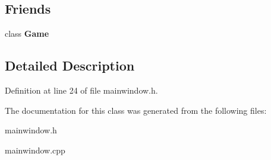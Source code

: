 \subsection*{Friends}
\begin{DoxyCompactItemize}
\item 
\hypertarget{class_main_window_aa2fab026580d6f14280c2ffb8063a314}{}class {\bfseries Game}\label{class_main_window_aa2fab026580d6f14280c2ffb8063a314}

\end{DoxyCompactItemize}


\subsection{Detailed Description}


Definition at line 24 of file mainwindow.\+h.



The documentation for this class was generated from the following files\+:\begin{DoxyCompactItemize}
\item 
mainwindow.\+h\item 
mainwindow.\+cpp\end{DoxyCompactItemize}
